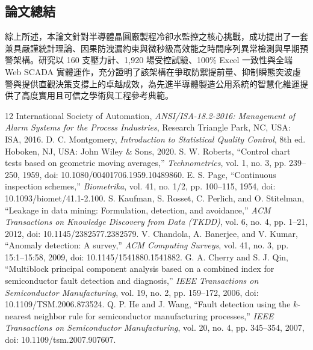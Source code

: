 \documentclass[fontset=none, a4paper, 12pt]{ctexart}
\begin{document}
\begin{doublespace}
\subsection{論文總結}
綜上所述，本論文針對半導體晶圓廠製程冷卻水監控之核心挑戰，成功提出了一套兼具嚴謹統計理論、因果防洩漏約束與微秒級高效能之時間序列異常檢測與早期預警架構。研究以 160 支壓力計、1,920 場受控試驗、100\% Excel 一致性與全端 Web SCADA 實體運作，充分證明了該架構在爭取防禦提前量、抑制瞬態突波虛警與提供直觀決策支撐上的卓越成效，為先進半導體製造公用系統的智慧化維運提供了高度實用且可信之學術與工程參考典範。

\clearpage
{}
{}

\begin{thebibliography}{12}
 International Society of Automation, \emph{ANSI/ISA-18.2-2016: Management of Alarm Systems for the Process Industries}, Research Triangle Park, NC, USA: ISA, 2016.
 D. C. Montgomery, \emph{Introduction to Statistical Quality Control}, 8th ed. Hoboken, NJ, USA: John Wiley \& Sons, 2020.
 S. W. Roberts, ``Control chart tests based on geometric moving averages,'' \emph{Technometrics}, vol. 1, no. 3, pp. 239--250, 1959, doi: 10.1080/00401706.1959.10489860.
 E. S. Page, ``Continuous inspection schemes,'' \emph{Biometrika}, vol. 41, no. 1/2, pp. 100--115, 1954, doi: 10.1093/biomet/41.1-2.100.
 S. Kaufman, S. Rosset, C. Perlich, and O. Stitelman, ``Leakage in data mining: Formulation, detection, and avoidance,'' \emph{ACM Transactions on Knowledge Discovery from Data (TKDD)}, vol. 6, no. 4, pp. 1--21, 2012, doi: 10.1145/2382577.2382579.
 V. Chandola, A. Banerjee, and V. Kumar, ``Anomaly detection: A survey,'' \emph{ACM Computing Surveys}, vol. 41, no. 3, pp. 15:1--15:58, 2009, doi: 10.1145/1541880.1541882.
 G. A. Cherry and S. J. Qin, ``Multiblock principal component analysis based on a combined index for semiconductor fault detection and diagnosis,'' \emph{IEEE Transactions on Semiconductor Manufacturing}, vol. 19, no. 2, pp. 159--172, 2006, doi: 10.1109/TSM.2006.873524.
 Q. P. He and J. Wang, ``Fault detection using the $k$-nearest neighbor rule for semiconductor manufacturing processes,'' \emph{IEEE Transactions on Semiconductor Manufacturing}, vol. 20, no. 4, pp. 345--354, 2007, doi: 10.1109/tsm.2007.907607.

\end{thebibliography}
\end{doublespace}
\end{document}
